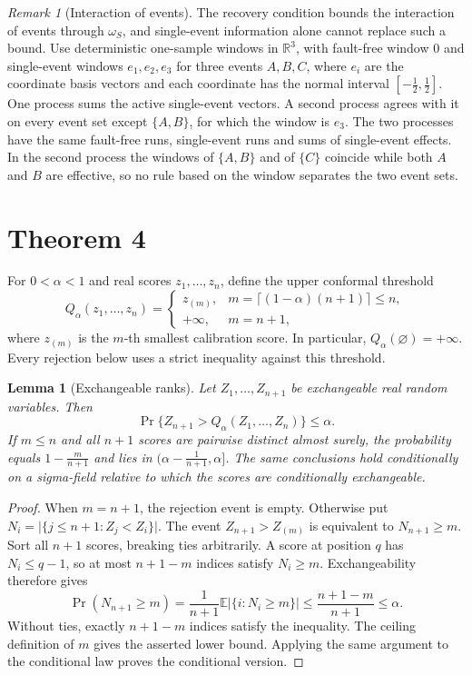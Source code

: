 \documentclass[10pt]{article}
\theoremstyle{plain}
\newtheorem{lemma}{Lemma}
\theoremstyle{remark}
\newtheorem{remark}{Remark}
\begin{document}
\begin{remark}[Interaction of events]
The recovery condition bounds the interaction of events through $\omega_S$, and single-event information alone cannot replace such a bound. Use deterministic one-sample windows in $\mathbb R^3$, with fault-free window $0$ and single-event windows $e_1,e_2,e_3$ for three events $A,B,C$, where $e_i$ are the coordinate basis vectors and each coordinate has the normal interval $[-\tfrac12,\tfrac12]$. One process sums the active single-event vectors. A second process agrees with it on every event set except $\{A,B\}$, for which the window is $e_3$. The two processes have the same fault-free runs, single-event runs and sums of single-event effects. In the second process the windows of $\{A,B\}$ and of $\{C\}$ coincide while both $A$ and $B$ are effective, so no rule based on the window separates the two event sets.
\end{remark}

\section{Theorem 4}
\label{sec:s-conformal}

For $0<\alpha<1$ and real scores $z_1,\ldots,z_n$, define the upper conformal threshold
\[
 Q_\alpha(z_1,\ldots,z_n)=
 \begin{cases}
 z_{(m)},&m=\lceil(1-\alpha)(n+1)\rceil\le n,\\
 +\infty,&m=n+1,
 \end{cases}
\]
where $z_{(m)}$ is the $m$-th smallest calibration score. In particular, $Q_\alpha(\varnothing)=+\infty$. Every rejection below uses a strict inequality against this threshold.

\begin{lemma}[Exchangeable ranks]
\label{lem:rank}
Let $Z_1,\ldots,Z_{n+1}$ be exchangeable real random variables. Then
\[
 \Pr\{Z_{n+1}>Q_\alpha(Z_1,\ldots,Z_n)\}\le\alpha.
\]
If $m\le n$ and all $n+1$ scores are pairwise distinct almost surely, the probability equals $1-\tfrac{m}{n+1}$ and lies in $(\alpha-\tfrac{1}{n+1},\alpha]$. The same conclusions hold conditionally on a sigma-field relative to which the scores are conditionally exchangeable.
\end{lemma}

\begin{proof}
When $m=n+1$, the rejection event is empty. Otherwise put $N_i=\lvert\{j\le n+1:Z_j<Z_i\}\rvert$. The event $Z_{n+1}>Z_{(m)}$ is equivalent to $N_{n+1}\ge m$. Sort all $n+1$ scores, breaking ties arbitrarily. A score at position $q$ has $N_i\le q-1$, so at most $n+1-m$ indices satisfy $N_i\ge m$. Exchangeability therefore gives
\[
 \Pr(N_{n+1}\ge m)=\frac{1}{n+1}\mathbb E\bigl\lvert\{i:N_i\ge m\}\bigr\rvert
 \le\frac{n+1-m}{n+1}\le\alpha.
\]
Without ties, exactly $n+1-m$ indices satisfy the inequality. The ceiling definition of $m$ gives the asserted lower bound. Applying the same argument to the conditional law proves the conditional version.
\end{proof}
\end{document}
